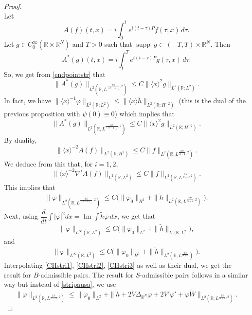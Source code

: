 \documentclass[10pt,leqno]{amsart}
\numberwithin{equation}{section}
\DeclareMathOperator{\im}{Im}
\DeclareMathOperator{\supp}{supp}
\newcommand{\field}[1]{\mathbb{#1}}
\newcommand{\R}{\field{R}}          		%
\begin{document}
\begin{proof}
\begin{equation}
\end{equation}
Let $$A(f)(t,x)=i\int_0^t e^{i(t-\tau)P} f(\tau,x)\, d\tau.$$
Let $g\in C_0^\infty (\R \times \R^N)$ and  $T>0$ such that $\supp\ g \subset (-T,T) \times \R^N$. Then
$$A^\ast (g)(t,x)=i\int_t^T e^{i(t-\tau)P}g(\tau ,x)\, d\tau .$$
So, we get from \eqref{endpointstr} that
$$\|A^\ast (g)\|_{L^2 (\R, L^{\frac{2N}{(N-4)_+},2 })} \leq C \|\langle x\rangle^2  g\|_{L^2 (\R ; L^2)}.$$
In fact, we have $ \|\langle x\rangle ^{-1} \varphi\|_{L^2 (\R; L^2)} \leq  \|\langle x\rangle  \tilde{h}\|_{L^2 (\R ; H^{-2})} $ (this is the dual of the previous proposition with $\psi(0)\equiv 0$) which implies that
$$\|A^\ast (g)\|_{L^2 (\R, L^{\frac{2N}{(N-4)_+},2 })} \leq C \|\langle x\rangle^2  g\|_{L^2 (\R; H^{-2})}.$$
By duality,
$$\|\langle x\rangle ^{-2}A(f) \|_{L^2 (\R; H^2)} \leq C \|f\|_{L^2 (\R , L^{\frac{2N}{N+4},2 })}. $$
We deduce from this that, for $i=1,2$, 
$$\|\langle x\rangle ^{-2} \nabla^{i} A(f) \|_{L^2 (\R; L^2)} \leq C \|f\|_{L^2 (\R , L^{\frac{2N}{N+4},2 })}. $$
This implies that
\begin{equation}
\label{CHstri1}
\|\varphi\|_{L^2 (\R , L^{\frac{2N}{(N-4)_+},2 })} \leq C\big( \|\varphi_0\|_{H^1} +   \|\tilde{h}\|_{L^2 (\R , L^{\frac{2N}{N+4},2 })}\big).
\end{equation}
Next, using $\dfrac{d}{dt}\int |\varphi|^2 dx = \im \int \tilde{h} \bar{\varphi}\, dx$, we get that
\begin{equation}
\label{CHstri2}
\|\varphi\|_{L^\infty (\R ,L^2)} \leq  C\big( \|\varphi_0\|_{L^2} +   \|\tilde{h}\|_{L^1 (\R, L^{2}}\big), 
\end{equation}
and
\begin{equation}
\label{CHstri3}
\|\varphi\|_{L^\infty (\R ,L^2)} \leq  C\big( \|\varphi_0\|_{H^1} +    \|\tilde{h}\|_{L^2 (\R, L^{\frac{2N}{N+4} })} \big).
\end{equation}
Interpolating \eqref{CHstri1}, \eqref{CHstri2}, \eqref{CHstri3} as well as their dual, we get the result for $B$-admissible pairs. The result for $S$-admissible pairs follows in a similar way but instead of \eqref{stripausa}, we use 
$$\|\varphi\|_{L^2 (\R, L^{\frac{2N}{N-2},2 })} \leq \|\varphi_0\|_{L^2} + \| \tilde{h} + 2V\Delta_{\R^N} \varphi +2V' \varphi ' +\varphi \tilde{W}\|_{L^2 (\R; L^{\frac{2N}{N+2} ,2})}. $$

\end{proof}
\end{document}
